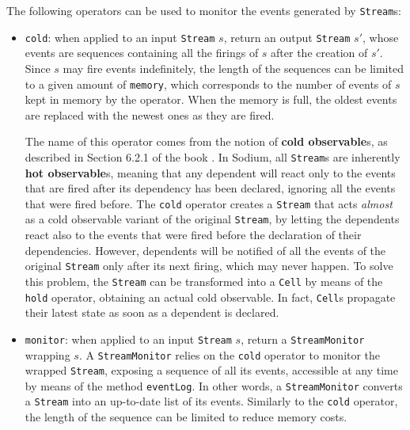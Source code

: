 The following operators can be used to monitor the events generated by
\texttt{Stream}s:
\begin{itemize}
  \item \texttt{cold}: when applied to an input \texttt{Stream} $s$, return an
        output \texttt{Stream} $s'$, whose events are sequences containing all
        the firings of $s$ after the creation of $s'$. Since $s$ may fire
        events indefinitely, the length of the sequences can be limited to a
        given amount of \texttt{memory}, which corresponds to the number of
        events of $s$ kept in memory by the operator. When the memory is full,
        the oldest events are replaced with the newest ones as they are fired.

        The name of this operator comes from the notion of \textbf{cold
        observable}s, as described in Section 6.2.1 of the book \cite{FRP}. In
        Sodium, all \texttt{Stream}s are inherently \textbf{hot observable}s,
        meaning that any dependent will react only to the events that are fired
        after its dependency has been declared, ignoring all the events that
        were fired before. The \texttt{cold} operator creates a \texttt{Stream}
        that acts \textit{almost} as a cold observable variant of the original
        \texttt{Stream}, by letting the dependents react also to the events
        that were fired before the declaration of their dependencies. However,
        dependents will be notified of all the events of the original
        \texttt{Stream} only after its next firing, which may never happen. To
        solve this problem, the \texttt{Stream} can be transformed into a
        \texttt{Cell} by means of the \texttt{hold} operator, obtaining an
        actual cold observable. In fact, \texttt{Cell}s propagate their latest
        state as soon as a dependent is declared.

  \item \texttt{monitor}: when applied to an input \texttt{Stream} $s$, return
        a \texttt{StreamMonitor} wrapping $s$. A \texttt{StreamMonitor} relies
        on the \texttt{cold} operator to monitor the wrapped \texttt{Stream},
        exposing a sequence of all its events, accessible at any time by means
        of the method \texttt{eventLog}. In other words, a
        \texttt{StreamMonitor} converts a \texttt{Stream} into an up-to-date
        list of its events. Similarly to the \texttt{cold} operator, the length
        of the sequence can be limited to reduce memory costs.
\end{itemize}

